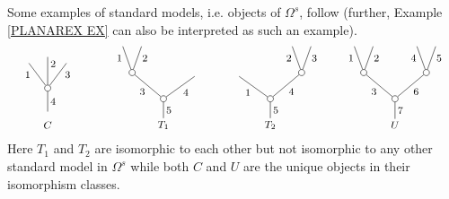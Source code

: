 \documentclass[a4paper,10pt]{article}%
\begin{document}
\begin{example}\label{STANDMODEL EX}
	Some examples of standard models, i.e. objects of $\Omega^s$, follow (further, Example \ref{PLANAREX EX} can also be interpreted as such an example).
\[
	\begin{tikzpicture}[grow=up,auto,level distance=2.1em,
	every node/.style = {font=\footnotesize,inner sep=2pt},
	dummy/.style={circle,draw,inner sep=0pt,minimum size=1.75mm}]
		\node at (-0.25,0) {$C$};
		\node at (-0.25,0.3) {}
			child{node [dummy] {}
				child[sibling distance = 1.5em,level distance= 2em]{
				edge from parent node [swap, near end] {$3$}}
				child[sibling distance = 1.5em,level distance= 2.5em]{
				edge from parent node [swap, near end] {$2$}}
				child[sibling distance = 1.5em,level distance= 2em]{
				edge from parent node [near end] {$1$}}
			edge from parent node [swap] {$4$}};
		\node at (3,0) {$T_1$}
			child{node [dummy] {}
				child[sibling distance = 5em, level distance=1.8em]{
				edge from parent node [swap] {$4$}}
				child[sibling distance = 5em]{node [dummy] {}
					child[sibling distance = 1.5em]{
					edge from parent node [swap,near end] {$2$}}
					child[sibling distance = 1.5em]{
					edge from parent node [near end] {$1$}}
				edge from parent node {$3$}}
			edge from parent node [swap] {$5$}};
		\node at (6,0) {$T_2$}
			child{node [dummy] {}
				child[sibling distance = 5em]{node [dummy] {}
					child[sibling distance = 1.5em]{
					edge from parent node [swap,near end] {$3$}}
					child[sibling distance = 1.5em]{
					edge from parent node [near end] {$2$}}
				edge from parent node [swap] {$4$}}
				child[sibling distance = 5em, level distance=1.8em]{
				edge from parent node {$1$}}
			edge from parent node [swap] {$5$}};
		\node at  (9.5,0) {$U$}
			child{node [dummy] {}
				child[sibling distance = 5em]{node [dummy] {}
					child[sibling distance = 1.5em]{
					edge from parent node [swap,near end] {$5$}}
					child[sibling distance = 1.5em]{
					edge from parent node [near end] {$4$}}
				edge from parent node [swap] {$6$}}
				child[sibling distance = 5em]{node [dummy] {}
					child[sibling distance = 1.5em]{
					edge from parent node [swap,near end] {$2$}}
					child[sibling distance = 1.5em]{
					edge from parent node [near end] {$1$}}
				edge from parent node {$3$}}
			edge from parent node [swap] {$7$}};
	\end{tikzpicture}
\]
Here $T_1$ and $T_2$ are isomorphic to each other but not isomorphic to any other standard model in $\Omega^s$ while both $C$ and $U$ are the unique objects in their isomorphism classes. 
\end{example}
\end{document}
